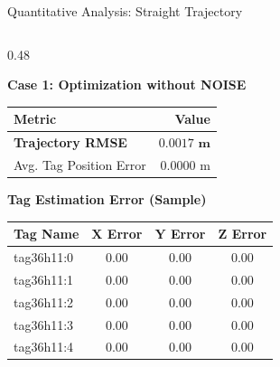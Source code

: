 \begin{frame}{Quantitative Analysis: Straight Trajectory}
    \centering
    \footnotesize %

    \centering
    


    \begin{columns}[T] %

        \begin{column}{0.48\textwidth}
            \centering

            \vspace{0.1cm}
            
            \textbf{Case 1: Optimization without NOISE}
            \vspace{0.1cm}

            \begin{tabular}{lr}
                \toprule
                \textbf{Metric} & \textbf{Value} \\
                \midrule
                \textbf{Trajectory RMSE} & $\mathbf{0.0017 \text{ m}}$ \\
                Avg. Tag Position Error & $0.0000 \text{ m}$ \\
                \bottomrule
            \end{tabular}

            \vspace{0.3cm}
            
            \textbf{Tag Estimation Error (Sample)}
            \begin{tabular}{lccc}
                \toprule
                \textbf{Tag Name} & $\mathbf{X}$ \textbf{Error} & $\mathbf{Y}$ \textbf{Error} & $\mathbf{Z}$ \textbf{Error} \\
                \midrule
                tag36h11:0 & $0.00$ & $0.00$ & $0.00$ \\
                tag36h11:1 & $0.00$ & $0.00$ & $0.00$ \\
                tag36h11:2 & $0.00$ & $0.00$ & $0.00$ \\
                tag36h11:3 & $0.00$ & $0.00$ & $0.00$ \\
                tag36h11:4 & $0.00$ & $0.00$ & $0.00$ \\
                \bottomrule
            \end{tabular}
        \end{column}


\end{columns}
\end{frame}
